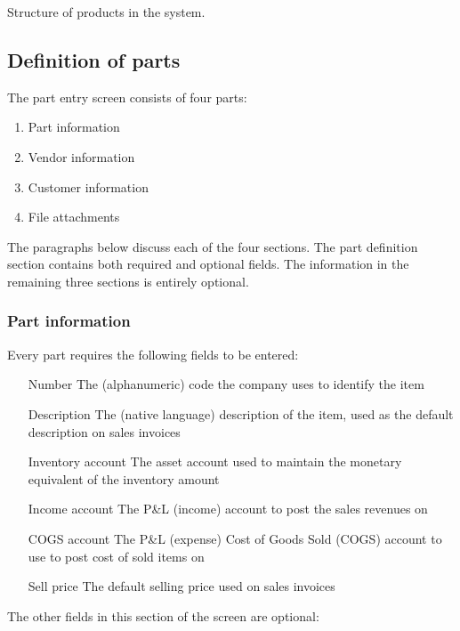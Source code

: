 Structure of products in the system.

\subsection{Definition of parts}
\label{subsec-products-parts-definition}

The part entry screen consists of four parts:

\begin{enumerate}
\item Part information
\item Vendor information
\item Customer information
\item File attachments
\end{enumerate}


The paragraphs below discuss each of the four sections. The part definition section
contains both required and optional fields. The information in the remaining
three sections is entirely optional.

\subsubsection{Part information}
\label{subsubsec-parts-information}

Every part requires the following fields to be entered:

\begin{itemize}
\item [Number] The (alphanumeric) code the company uses to identify the item
\item [Description] The (native language) description of the item, used as the default
	description on sales invoices
\item [Inventory account] The asset account used to maintain the monetary equivalent
	of the inventory amount
\item [Income account] The P\&L (income) account to post the sales revenues on
\item [COGS account] The P\&L (expense) Cost of Goods Sold (COGS) account to use
	to post cost of sold items on
\item [Sell price] The default selling price used on sales invoices
\end{itemize}


The other fields in this section of the screen are optional:

